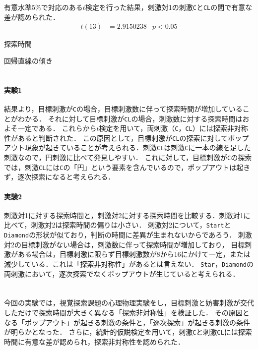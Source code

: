 有意水準\(5\%\)で対応のある\(t\)検定を行った結果，刺激対1の刺激\texttt{C}と\texttt{CL}の間で有意な差が認められた．
\begin{align}
    t(13) & =2.9150238 & p<0.05
\end{align}
\begin{table}[H]
    \centering
    \caption{探索時間}
    \label{tbl:探索時間}
    \fontsize{4}{7}\selectfont\ttfamily
    
\end{table}
\begin{table}[H]
    \centering
    \caption{回帰直線の傾き}
    \label{tbl:回帰直線の傾き}
    \fontsize{4}{7}\selectfont\ttfamily
    
\end{table}
\section{\consideration}
\paragraph{実験1}
結果より，目標刺激が\texttt{C}の場合，目標刺激数に伴って探索時間が増加していることがわかる．
それに対して目標刺激が\texttt{CL}の場合，刺激数に対する探索時間はおよそ一定である．
これらから\(t\)検定を用いて，両刺激（\texttt{C}，\texttt{CL}）には探索非対称性があると判断された．
この原因として，目標刺激が\texttt{CL}の探索に対してポップアウト現象が起きていることが考えられる．刺激\texttt{CL}は刺激\texttt{C}に一本の線を足した刺激なので，円刺激に比べて発見しやすい．
これに対して，目標刺激が\texttt{C}の探索では，刺激\texttt{CL}には\texttt{C}の「円」という要素を含んでいるので，ポップアウトは起きず，逐次探索になると考えられる．
\paragraph{実験2}
刺激対1に対する探索時間と，刺激対2に対する探索時間を比較する．刺激対1に比べて，刺激対2は探索時間の偏りは小さい．
刺激対2について，\texttt{Start}と\texttt{Diamond}の形状が似ており，判断の時間に差異が生まれないからであろう．
刺激対2の目標刺激がない場合は，刺激数に伴って探索時間が増加しており，
目標刺激がある場合は，目標刺激に限らず目標刺激数が8から16にかけて一定，または減少している．これは「探索非対称性」があるとは言えない．
\texttt{Star}，\texttt{Diamond}の両刺激において，逐次探索でなくポップアウトが生じていると考えられる．
\section{\conclusion}
今回の実験では，視覚探索課題の心理物理実験をし，目標刺激と妨害刺激が交代しただけで探索時間が大きく異なる「探索非対称性」を検証した．
その原因となる「ポップアウト」が起きる刺激の条件と，「逐次探索」が起きる刺激の条件が明らかとなった．
さらに，統計的仮説検定を用いて，刺激\texttt{C}と刺激\texttt{CL}には探索時間に有意な差が認められ，探索非対称性を認められた．
